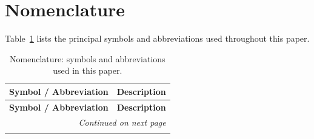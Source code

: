 
\section{Nomenclature}\label{app:nomenclature}

Table~\ref{tab:nomenclature} lists the principal symbols and abbreviations used throughout this paper.

\begin{longtable}{p{2.8cm} p{9.2cm}}
\caption{Nomenclature: symbols and abbreviations used in this paper.}
\label{tab:nomenclature} \\
\toprule
\textbf{Symbol / Abbreviation} & \textbf{Description} \\
\midrule
\endfirsthead
\toprule
\textbf{Symbol / Abbreviation} & \textbf{Description} \\
\midrule
\endhead
\midrule
\multicolumn{2}{r}{\emph{Continued on next page}} \\
\endfoot
\bottomrule
\endlastfoot


\end{longtable}
